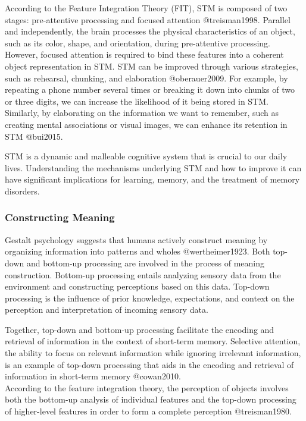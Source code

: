 \documentclass[
]{article}
\begin{document}
According to the Feature Integration Theory (FIT), STM is composed of
two stages: pre-attentive processing and focused attention
@treisman1998. Parallel and independently, the brain processes the
physical characteristics of an object, such as its color, shape, and
orientation, during pre-attentive processing. However, focused attention
is required to bind these features into a coherent object representation
in STM. STM can be improved through various strategies, such as
rehearsal, chunking, and elaboration @oberauer2009. For example, by
repeating a phone number several times or breaking it down into chunks
of two or three digits, we can increase the likelihood of it being
stored in STM. Similarly, by elaborating on the information we want to
remember, such as creating mental associations or visual images, we can
enhance its retention in STM @bui2015.

STM is a dynamic and malleable cognitive system that is crucial to our
daily lives. Understanding the mechanisms underlying STM and how to
improve it can have significant implications for learning, memory, and
the treatment of memory disorders.

\hypertarget{constructing-meaning}{%
\subsubsection{Constructing Meaning}\label{constructing-meaning}}

Gestalt psychology suggests that humans actively construct meaning by
organizing information into patterns and wholes @wertheimer1923. Both
top-down and bottom-up processing are involved in the process of meaning
construction. Bottom-up processing entails analyzing sensory data from
the environment and constructing perceptions based on this data.
Top-down processing is the influence of prior knowledge, expectations,
and context on the perception and interpretation of incoming sensory
data.

Together, top-down and bottom-up processing facilitate the encoding and
retrieval of information in the context of short-term memory. Selective
attention, the ability to focus on relevant information while ignoring
irrelevant information, is an example of top-down processing that aids
in the encoding and retrieval of information in short-term memory
@cowan2010.\\
According to the feature integration theory, the perception of objects
involves both the bottom-up analysis of individual features and the
top-down processing of higher-level features in order to form a complete
perception @treisman1980.
\end{document}
